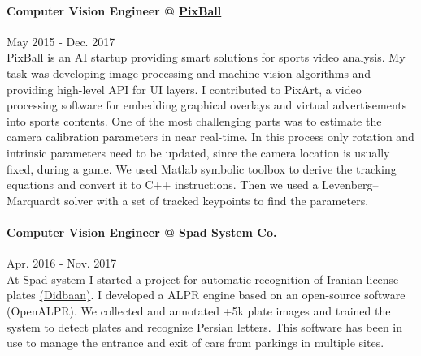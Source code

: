 \documentclass[10pt]{res}
\begin{document}
\begin{resume}
\paragraph{Computer Vision Engineer @ \href{http://pixballsports.com}{PixBall}}  \hfill May 2015 - Dec. 2017\\
PixBall is an AI startup providing smart solutions for sports video analysis. My task was developing image processing and machine vision algorithms and providing high-level API for UI layers. I contributed to PixArt, a video processing software for embedding graphical overlays and virtual advertisements into sports contents. One of the most challenging parts was to estimate the camera calibration parameters in near real-time. In this process only rotation and intrinsic parameters need to be updated, since the camera location is usually fixed, during a game. We used Matlab symbolic toolbox to derive the tracking equations and convert it to C++ instructions. Then we used a Levenberg–Marquardt solver with a set of tracked keypoints to find the parameters.

\paragraph{Computer Vision Engineer @ \href{http://www.spadsystem.com/}{Spad System Co.} } \hfill Apr. 2016 - Nov. 2017\\
At Spad-system I started a project for automatic recognition of Iranian license plates \href{http://didbaan.com}{(Didbaan)}. I developed a ALPR engine based on an open-source software (OpenALPR). We collected and annotated +5k plate images and trained the system to detect plates and recognize Persian letters. This software has been in use to manage the entrance and exit of cars from parkings in multiple sites.


\end{resume}
\end{document}
